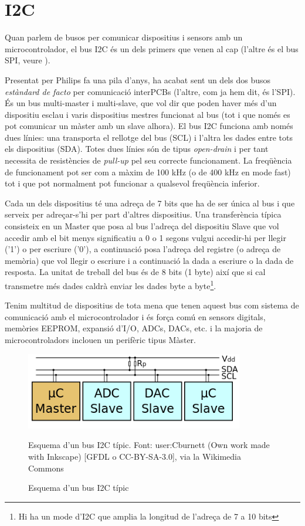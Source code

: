 \chapter{I2C}
\label{sub:I2C}
Quan parlem de busos per comunicar dispositius i sensors amb un microcontrolador, el bus \gls{I2C} és un dels primers que venen al cap (l'altre és el bus \gls{SPI}, veure ).

Presentat per Philips fa una pila d'anys, ha acabat sent un dels dos busos {\em estàndard de facto} per comunicació interPCBs (l'altre, com ja hem dit, és l'\gls{SPI}). És un bus multi-master i multi-slave, que vol dir que poden haver més d'un dispositiu esclau i varis dispositius mestres funcionat al bus (tot i que només es pot comunicar un màster amb un slave alhora). El bus I2C funciona amb només dues línies: una transporta el rellotge del bus (\gls{SCL}) i l'altra les dades entre tots els dispositius (\gls{SDA}). Totes dues línies són de tipus {\em open-drain} i per tant necessita de resistències de {\em pull-up} pel seu correcte funcionament. La freqüència de funcionament pot ser com a màxim de 100 kHz (o de 400 kHz en mode fast) tot i que pot normalment pot funcionar a qualsevol freqüència inferior.

Cada un dels dispositius té una adreça de 7 bits que ha de ser única al bus i que serveix per adreçar-s'hi per part d'altres dispositius. Una transferència típica consisteix en un Master que posa al bus l'adreça del dispositiu Slave que vol accedir amb el bit menys significatiu a 0 o 1 segons vulgui accedir-hi per llegir ('1') o per escriure ('0'), a continuació posa l'adreça del registre (o adreça de memòria) que vol llegir o escriure i a continuació la dada a escriure o la dada de resposta. La unitat de treball del bus és de 8 bits (1 byte) així que si cal transmetre més dades caldrà enviar les dades byte a byte\footnote{Hi ha un mode d'I2C que amplia la longitud de l'adreça de 7 a 10 bits}.

Tenim multitud de dispositius de tota mena que tenen aquest bus com sistema de comunicació amb el microcontrolador i és força comú en sensors digitals, memòries EEPROM, expansió d'I/O, \glspl{ADC}, \glspl{DAC}, etc. i la majoria de microcontroladors inclouen un perifèric tipus Màster.

\begin{figure}
 \centering
 \includegraphics[width=0.85\textwidth, keepaspectratio]{imatges/I2C.png}
 \caption{Esquema d'un bus I2C típic}{Esquema d'un bus I2C típic. Font: user:Cburnett (Own work made with Inkscape) [GFDL o CC-BY-SA-3.0], via la Wikimedia Commons}
 \label{fig:I2C}
\end{figure}

